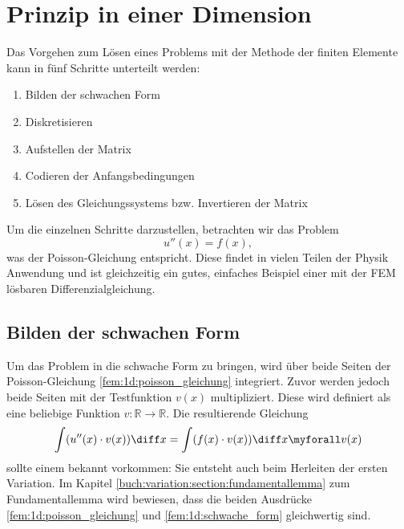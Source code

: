 %
%
%
%
\section{Prinzip in einer Dimension\label{fem:1d}}

Das Vorgehen zum Lösen eines Problems mit der Methode der finiten Elemente kann in fünf Schritte unterteilt werden:
\begin{enumerate}
    \item Bilden der schwachen Form
    \item Diskretisieren
    \item Aufstellen der Matrix
    \item Codieren der Anfangsbedingungen
    \item Lösen des Gleichungssystems bzw. Invertieren der Matrix
\end{enumerate}

Um die einzelnen Schritte darzustellen, betrachten wir das Problem
\begin{equation}
    u''(x) = f(x)
    \label{fem:1d:poisson_gleichung},
\end{equation}
was der Poisson-Gleichung entspricht. 
Diese findet in vielen Teilen der Physik Anwendung und ist gleichzeitig ein gutes, einfaches Beispiel einer mit der FEM lösbaren Differenzialgleichung.


\subsection{Bilden der schwachen Form}
Um das Problem in die schwache Form zu bringen, wird über beide Seiten der Poisson-Gleichung \ref{fem:1d:poisson_gleichung} integriert.
Zuvor werden jedoch beide Seiten mit der Testfunktion $ v(x) $ multipliziert.
Diese wird definiert als eine beliebige Funktion $ v \colon \mathbb{R} \rightarrow \mathbb{R} $.
Die resultierende Gleichung
\begin{equation}
    \int(u''(x) \cdot v(x)) \diff x = \int(f(x) \cdot v(x)) \diff x \myforall v(x)
    \label{fem:1d:schwache_form}
\end{equation}
sollte einem bekannt vorkommen: Sie entsteht auch beim Herleiten der ersten Variation.
Im Kapitel \ref{buch:variation:section:fundamentallemma} zum Fundamentallemma wird bewiesen, dass die beiden Ausdrücke \ref{fem:1d:poisson_gleichung} und \ref{fem:1d:schwache_form} gleichwertig sind.

